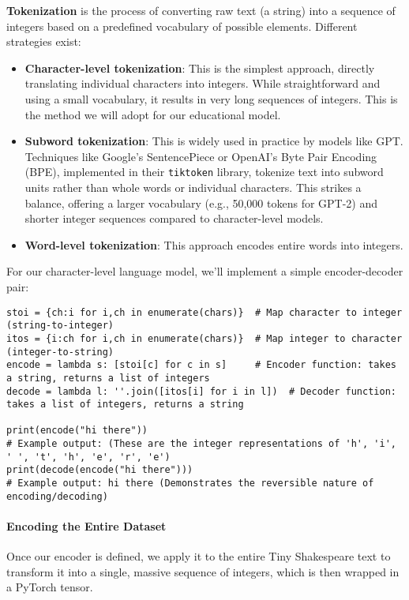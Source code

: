 \textbf{Tokenization} is the process of converting raw text (a string) into a sequence of integers based on a predefined vocabulary of possible elements. Different strategies exist:
\begin{itemize}
    \item \textbf{Character-level tokenization}: This is the simplest approach, directly translating individual characters into integers. While straightforward and using a small vocabulary, it results in very long sequences of integers. This is the method we will adopt for our educational model.
    \item \textbf{Subword tokenization}: This is widely used in practice by models like GPT. Techniques like Google's SentencePiece or OpenAI's Byte Pair Encoding (BPE), implemented in their \texttt{tiktoken} library, tokenize text into subword units rather than whole words or individual characters. This strikes a balance, offering a larger vocabulary (e.g., 50,000 tokens for GPT-2) and shorter integer sequences compared to character-level models.
    \item \textbf{Word-level tokenization}: This approach encodes entire words into integers.
\end{itemize}

For our character-level language model, we'll implement a simple encoder-decoder pair:

\begin{lstlisting}[caption={Character-level encoder and decoder}]
stoi = {ch:i for i,ch in enumerate(chars)}  # Map character to integer (string-to-integer)
itos = {i:ch for i,ch in enumerate(chars)}  # Map integer to character (integer-to-string)
encode = lambda s: [stoi[c] for c in s]     # Encoder function: takes a string, returns a list of integers
decode = lambda l: ''.join([itos[i] for i in l])  # Decoder function: takes a list of integers, returns a string

print(encode("hi there"))
# Example output: (These are the integer representations of 'h', 'i', ' ', 't', 'h', 'e', 'r', 'e')
print(decode(encode("hi there")))
# Example output: hi there (Demonstrates the reversible nature of encoding/decoding)
\end{lstlisting}

\paragraph{Encoding the Entire Dataset}

Once our encoder is defined, we apply it to the entire Tiny Shakespeare text to transform it into a single, massive sequence of integers, which is then wrapped in a PyTorch tensor.

